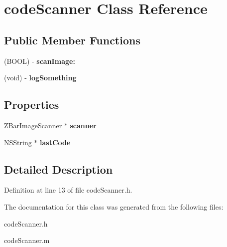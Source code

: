 \hypertarget{interfacecode_scanner}{
\section{codeScanner Class Reference}
\label{interfacecode_scanner}
}
\subsection*{Public Member Functions}
\begin{DoxyCompactItemize}
\item 
\hypertarget{interfacecode_scanner_aa922540eabdce6de35fdd8eac84f2333}{
(BOOL) -\/ {\bfseries scanImage:}}
\label{interfacecode_scanner_aa922540eabdce6de35fdd8eac84f2333}

\item 
\hypertarget{interfacecode_scanner_ad3f2bb20f5b42071efcbdf0bcbc3b47d}{
(void) -\/ {\bfseries logSomething}}
\label{interfacecode_scanner_ad3f2bb20f5b42071efcbdf0bcbc3b47d}

\end{DoxyCompactItemize}
\subsection*{Properties}
\begin{DoxyCompactItemize}
\item 
\hypertarget{interfacecode_scanner_a65b46e21c00820ec14dd8621e79366b9}{
ZBarImageScanner $\ast$ {\bfseries scanner}}
\label{interfacecode_scanner_a65b46e21c00820ec14dd8621e79366b9}

\item 
\hypertarget{interfacecode_scanner_a93346aeb8d861a9c6c499367d19a3386}{
NSString $\ast$ {\bfseries lastCode}}
\label{interfacecode_scanner_a93346aeb8d861a9c6c499367d19a3386}

\end{DoxyCompactItemize}


\subsection{Detailed Description}


Definition at line 13 of file codeScanner.h.



The documentation for this class was generated from the following files:\begin{DoxyCompactItemize}
\item 
codeScanner.h\item 
codeScanner.m\end{DoxyCompactItemize}
